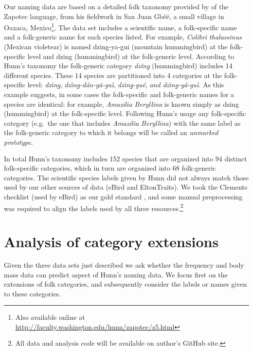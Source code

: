 \documentclass[10pt,letterpaper]{article}
\begin{document}
Our naming data are based on a detailed folk taxonomy provided by  of the Zapotec language, from his fieldwork in San Juan Gb\"{e}\"{e}, a small village in Oaxaca, Mexico\footnote{ Also available online at \url{http://faculty.washington.edu/hunn/zapotec/z5.html}}. The data set includes a scientific name,  a folk-specific name and a folk-generic name for each species listed. For example, \emph{ Colibri thalassinus} (Mexican violetear) is named dzing-ya-gui (mountain hummingbird) at the folk-specific level and dzing (hummingbird) at the folk-generic level.  According to Hunn's taxonomy the folk-generic category \textit{dz\v{i}n\b{g}} (hummingbird) includes 14 different species. These 14 species are partitioned into 4 categories at the folk-specific level: \textit{dz\v{\i}n\b{g}}, \textit{dz\v{\i}n\b{g}-d\'{a}n-y\v{a}-gu\`{i}}, \textit{dz\v{\i}n\b{g}-gu\'{e}}, \textit{and dz\v{\i}n\b{g}-y\v{a}-gu\`{i}}.
As this example suggests, in some cases the folk-specific and folk-generic names for a species are identical: for example, 
 \emph{ Amazilia Beryllina} is known simply as  dzing (hummingbird) at the folk-specific level.  Following Hunn's usage any folk-specific category (e.g.\ the one that includes \emph{ Amazilia Beryllina}) with the same label as the folk-generic category to which it belongs will be called an \emph{unmarked prototype}.


In total Hunn's taxonomy includes 152 species that are organized into 94 distinct folk-specific categories, which in turn are organized into 68 folk-generic categories.  The scientific species labels given by Hunn  did not always match those used by our other sources of data (eBird and EltonTraits).  We took the Clements checklist (used by eBird) as our gold standard \cite{clements2007clements}, and some manual preprocessing was required to align the labels used by all three resources.\footnote{All data and analysis code will be available on author's GitHub site.}



\section{Analysis of category extensions}

Given the three data sets just described we ask whether the frequency and body mass data can predict aspect of Hunn's naming data.  We focus first on the extensions of folk categories, and subsequently consider the labels or names given to these categories. 
\end{document}
